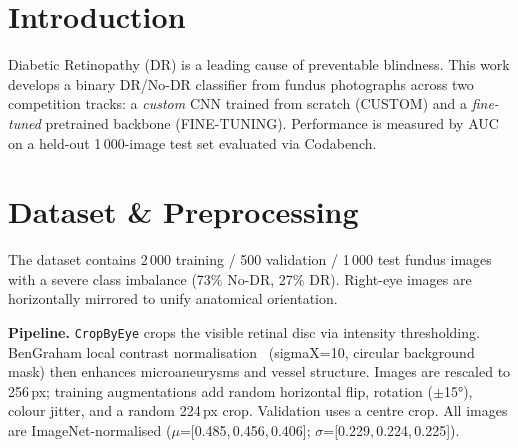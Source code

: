 \documentclass[a4paper, 10pt, twocolumn]{article}
\begin{document}

\section{Introduction}

Diabetic Retinopathy (DR) is a leading cause of preventable blindness.
This work develops a binary DR/No-DR classifier from fundus photographs
across two competition tracks: a \emph{custom} CNN trained from scratch
(CUSTOM) and a \emph{fine-tuned} pretrained backbone (FINE-TUNING).
Performance is measured by AUC on a held-out 1\,000-image test set
evaluated via Codabench.

\section{Dataset \& Preprocessing}

The dataset contains 2\,000 training / 500 validation / 1\,000 test fundus
images with a severe class imbalance (73\% No-DR, 27\% DR). Right-eye
images are horizontally mirrored to unify anatomical orientation.

\textbf{Pipeline.}
\texttt{CropByEye} crops the visible retinal disc via intensity thresholding.
BenGraham local contrast normalisation~\cite{graham2015kaggle} (sigmaX=10,
circular background mask) then enhances microaneurysms and vessel structure.
Images are rescaled to 256\,px; training augmentations add random horizontal
flip, rotation ($\pm$15°), colour jitter, and a random 224\,px crop.
Validation uses a centre crop. All images are ImageNet-normalised
($\mu$=[0.485,\,0.456,\,0.406]; $\sigma$=[0.229,\,0.224,\,0.225]).
\end{document}
